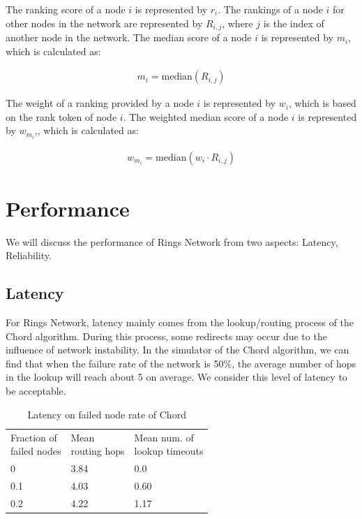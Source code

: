 \documentclass[twocolumn]{article}
\begin{document}
The ranking score of a node $i$ is represented by $r_i$. The rankings of a node $i$ for other nodes in the network are represented by $R_{i,j}$, where $j$ is the index of another node in the network. The median score of a node $i$ is represented by $m_i$, which is calculated as:

\begin{gather}
m_i = \text{median}(R_{i,j})
\end{gather}

The weight of a ranking provided by a node $i$ is represented by $w_i$, which is based on the rank token of node $i$. The weighted median score of a node $i$ is represented by $w_{m_i}$,, which is calculated as:

\begin{gather}
w_{m_i} = \text{median}(w_i \cdot R_{i,j})
\end{gather}

\section{Performance}

We will discuss the performance of Rings Network from two aspects: Latency, Reliability.

\subsection{Latency}
For Rings Network, latency mainly comes from the lookup/routing process of the Chord algorithm. During this process, some redirects may occur due to the influence of network instability. In the simulator of the Chord algorithm, we can find that when the failure rate of the network is 50\%, the average number of hops in the lookup will reach about 5 on average. We consider this level of latency to be acceptable.

\begin{table}[htbp]
\begin{tabular}{l|l|l}
\cline{1-3}
  \shortstack{Fraction of \\failed nodes} & \shortstack{Mean \\routing hops} &\shortstack{Mean num. of \\lookup timeouts}   \\ \cline{1-3}
0                        & 3.84             & 0.0                     \\ \cline{1-3}
0.1                      & 4.03             & 0.60                    \\ \cline{1-3}
0.2                      & 4.22             & 1.17                    \\ \cline{1-3}
\end{tabular}
\caption{Latency on failed node rate of Chord \cite{Chord}}
\end{table}
\end{document}
